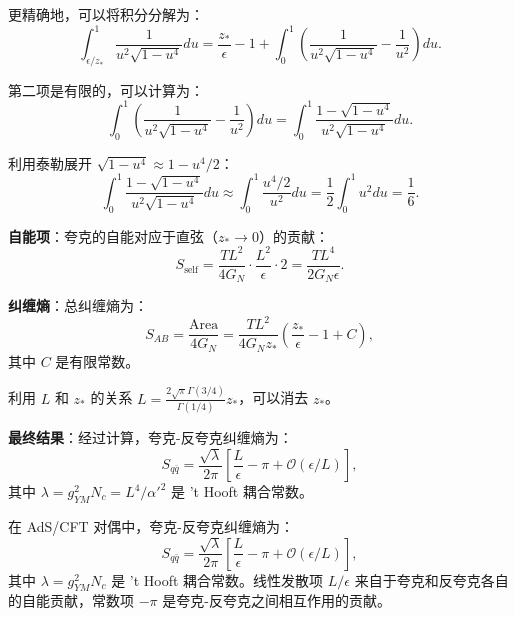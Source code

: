 更精确地，可以将积分分解为：
\begin{equation}
    \int_{\epsilon/z_*}^1 \frac{1}{u^2 \sqrt{1 - u^4}} du = \frac{z_*}{\epsilon} - 1 + \int_0^1 \left(\frac{1}{u^2 \sqrt{1 - u^4}} - \frac{1}{u^2}\right) du.
\end{equation}

第二项是有限的，可以计算为：
\begin{equation}
    \int_0^1 \left(\frac{1}{u^2 \sqrt{1 - u^4}} - \frac{1}{u^2}\right) du = \int_0^1 \frac{1 - \sqrt{1 - u^4}}{u^2 \sqrt{1 - u^4}} du.
\end{equation}

利用泰勒展开 $\sqrt{1 - u^4} \approx 1 - u^4/2$：
\begin{equation}
    \int_0^1 \frac{1 - \sqrt{1 - u^4}}{u^2 \sqrt{1 - u^4}} du \approx \int_0^1 \frac{u^4/2}{u^2} du = \frac{1}{2} \int_0^1 u^2 du = \frac{1}{6}.
\end{equation}

\textbf{自能项}：夸克的自能对应于直弦（$z_* \to 0$）的贡献：
\begin{equation}
    S_{\text{self}} = \frac{T L^2}{4 G_N} \cdot \frac{L^2}{\epsilon} \cdot 2 = \frac{T L^4}{2 G_N \epsilon}.
\end{equation}

\textbf{纠缠熵}：总纠缠熵为：
\begin{equation}
    S_{AB} = \frac{\text{Area}}{4 G_N} = \frac{T L^2}{4 G_N z_*} \left(\frac{z_*}{\epsilon} - 1 + C\right),
\end{equation}
其中 $C$ 是有限常数。

利用 $L$ 和 $z_*$ 的关系 $L = \frac{2\sqrt{\pi} \Gamma(3/4)}{\Gamma(1/4)} z_*$，可以消去 $z_*$。

\textbf{最终结果}：经过计算，夸克-反夸克纠缠熵为：
\begin{equation}
    S_{q\bar{q}} = \frac{\sqrt{\lambda}}{2\pi} \left[\frac{L}{\epsilon} - \pi + \mathcal{O}(\epsilon/L)\right],
\end{equation}
其中 $\lambda = g_{YM}^2 N_c = L^4/\alpha'^2$ 是 't Hooft 耦合常数。

\begin{theorem}[夸克-反夸克纠缠熵] \label{thm:qq_ee}
在 AdS/CFT 对偶中，夸克-反夸克纠缠熵为：
\begin{equation}
    S_{q\bar{q}} = \frac{\sqrt{\lambda}}{2\pi} \left[\frac{L}{\epsilon} - \pi + \mathcal{O}(\epsilon/L)\right],
\end{equation}
其中 $\lambda = g_{YM}^2 N_c$ 是 't Hooft 耦合常数。线性发散项 $L/\epsilon$ 来自于夸克和反夸克各自的自能贡献，常数项 $-\pi$ 是夸克-反夸克之间相互作用的贡献。
\end{theorem}

